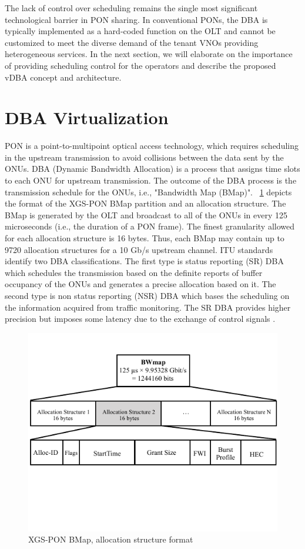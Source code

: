  The lack of control over scheduling remains the single most significant technological barrier in \ac{PON} sharing. In conventional \acp{PON}, the \ac{DBA} is typically implemented as a hard-coded function on the \ac{OLT} and cannot be customized to meet the diverse demand of the tenant \acp{VNO} providing heterogeneous services. 
 In the next section, we will elaborate on the importance of providing scheduling control for the operators and describe the proposed \ac{vDBA} concept and architecture.
 

 
 
\section{DBA Virtualization}
\ac{PON} is a point-to-multipoint optical access technology, which requires scheduling in the upstream transmission to avoid collisions between the data sent by the ONUs. \ac{DBA} (Dynamic Bandwidth Allocation) is a process that assigns time slots to each \ac{ONU} for upstream transmission. The outcome of the \ac{DBA} process is the transmission schedule for the ONUs, i.e., "Bandwidth Map (BMap)".  \figureautorefname~\ref{BMap} depicts the format of the XGS-\ac{PON} \cite{G.9807.1} \ac{BMap} partition and an allocation structure. The \ac{BMap} is generated by the OLT and broadcast to all of the ONUs in every 125 microseconds (i.e., the duration of a \ac{PON} frame). The finest granularity allowed for each allocation structure is 16 bytes. Thus, each \ac{BMap} may contain up to 9720 allocation structures for a 10 Gb/s upstream channel. ITU standards identify two \ac{DBA} classifications. The first type is status reporting (SR) \ac{DBA} which schedules the transmission based on the definite reports of buffer occupancy of the ONUs and generates a precise allocation based on it. The second type is non status reporting (NSR) \ac{DBA} which bases the scheduling on the information acquired from traffic monitoring. The SR \ac{DBA} provides higher precision but imposes some latency due to the exchange of control signals \cite{haran2008importance}.
\begin{figure}[htbp]
\centering
 \includegraphics[width=0.8\columnwidth]{Figures/BMap.pdf}
\caption{XGS-\ac{PON} BMap, allocation structure format}
\label{BMap}
\end{figure}
